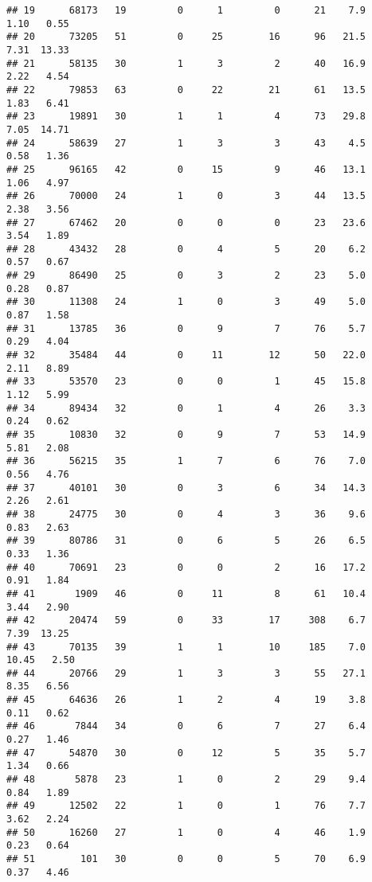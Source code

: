 \documentclass[
]{article}
\begin{document}
\begin{verbatim}
## 19      68173   19         0      1         0      21    7.9    1.10   0.55
## 20      73205   51         0     25        16      96   21.5    7.31  13.33
## 21      58135   30         1      3         2      40   16.9    2.22   4.54
## 22      79853   63         0     22        21      61   13.5    1.83   6.41
## 23      19891   30         1      1         4      73   29.8    7.05  14.71
## 24      58639   27         1      3         3      43    4.5    0.58   1.36
## 25      96165   42         0     15         9      46   13.1    1.06   4.97
## 26      70000   24         1      0         3      44   13.5    2.38   3.56
## 27      67462   20         0      0         0      23   23.6    3.54   1.89
## 28      43432   28         0      4         5      20    6.2    0.57   0.67
## 29      86490   25         0      3         2      23    5.0    0.28   0.87
## 30      11308   24         1      0         3      49    5.0    0.87   1.58
## 31      13785   36         0      9         7      76    5.7    0.29   4.04
## 32      35484   44         0     11        12      50   22.0    2.11   8.89
## 33      53570   23         0      0         1      45   15.8    1.12   5.99
## 34      89434   32         0      1         4      26    3.3    0.24   0.62
## 35      10830   32         0      9         7      53   14.9    5.81   2.08
## 36      56215   35         1      7         6      76    7.0    0.56   4.76
## 37      40101   30         0      3         6      34   14.3    2.26   2.61
## 38      24775   30         0      4         3      36    9.6    0.83   2.63
## 39      80786   31         0      6         5      26    6.5    0.33   1.36
## 40      70691   23         0      0         2      16   17.2    0.91   1.84
## 41       1909   46         0     11         8      61   10.4    3.44   2.90
## 42      20474   59         0     33        17     308    6.7    7.39  13.25
## 43      70135   39         1      1        10     185    7.0   10.45   2.50
## 44      20766   29         1      3         3      55   27.1    8.35   6.56
## 45      64636   26         1      2         4      19    3.8    0.11   0.62
## 46       7844   34         0      6         7      27    6.4    0.27   1.46
## 47      54870   30         0     12         5      35    5.7    1.34   0.66
## 48       5878   23         1      0         2      29    9.4    0.84   1.89
## 49      12502   22         1      0         1      76    7.7    3.62   2.24
## 50      16260   27         1      0         4      46    1.9    0.23   0.64
## 51        101   30         0      0         5      70    6.9    0.37   4.46

\end{verbatim}
\end{document}
